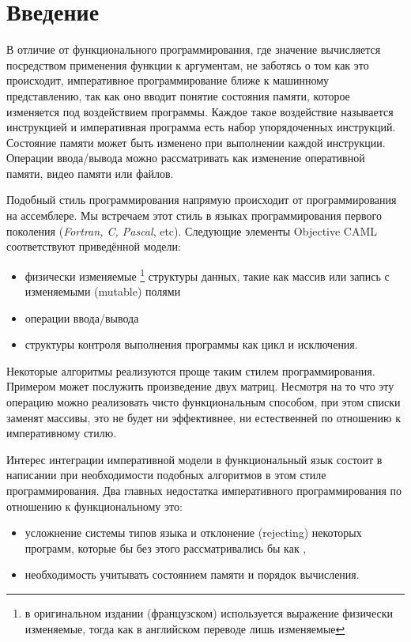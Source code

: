\section{Введение}

В отличие от функционального программирования, где значение вычисляется
посредством применения функции к аргументам, не заботясь о том как это
происходит, императивное программирование ближе к машинному представлению, так
как оно вводит понятие состояния памяти, которое изменяется под воздействием
программы. Каждое такое воздействие называется инструкцией и императивная
программа есть набор упорядоченных инструкций. Состояние памяти может быть
изменено при выполнении каждой инструкции. Операции ввода/вывода можно
рассматривать как изменение оперативной памяти, видео памяти или файлов.

Подобный стиль программирования напрямую происходит от программирования на
ассемблере. Мы встречаем этот стиль в языках программирования первого поколения
({\it Fortran, C, Pascal}, etc). Следующие элементы Objective CAML соответствуют
приведённой модели:

\begin{itemize}
	\item физически изменяемые \footnote{в оригинальном издании (французском)
используется выражение физически изменяемые, тогда как в английском переводе
лишь изменяемые} структуры данных, такие как массив или запись с
изменяемыми (mutable) полями

	\item операции ввода/вывода

	\item структуры контроля выполнения программы как цикл и исключения.
\end{itemize}

Некоторые алгоритмы реализуются проще таким стилем программирования. Примером
может послужить произведение двух матриц. Несмотря на то что эту операцию можно
реализовать чисто функциональным способом, при этом списки заменят массивы, это
не будет ни эффективнее, ни естественней по отношению к императивному стилю.

Интерес интеграции императивной модели в функциональный язык состоит в написании
при необходимости подобных алгоритмов в этом стиле программирования. Два главных
недостатка императивного программирования по отношению к функциональному это:

\begin{itemize}
	\item усложнение системы типов языка и отклонение (rejecting) некоторых
программ, которые бы без этого рассматривались бы как ,

	\item необходимость учитывать состоянием памяти и порядок вычисления. 
\end{itemize}

